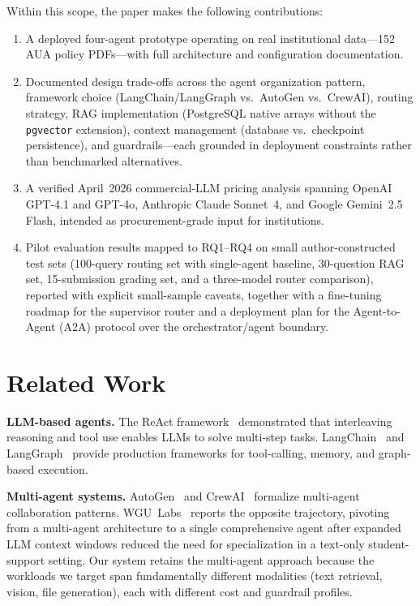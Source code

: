 \documentclass[conference]{IEEEtran}
\begin{document}
Within this scope, the paper makes the following contributions:
\begin{enumerate}
    \item A deployed four-agent prototype operating on real institutional data---152 AUA policy PDFs---with full architecture and configuration documentation.
    \item Documented design trade-offs across the agent organization pattern, framework choice (LangChain/LangGraph vs.\ AutoGen vs.\ CrewAI), routing strategy, RAG implementation (PostgreSQL native arrays without the \texttt{pgvector} extension), context management (database vs.\ checkpoint persistence), and guardrails---each grounded in deployment constraints rather than benchmarked alternatives.
    \item A verified April~2026 commercial-LLM pricing analysis spanning OpenAI GPT-4.1 and GPT-4o, Anthropic Claude Sonnet~4, and Google Gemini~2.5 Flash, intended as procurement-grade input for institutions.
    \item Pilot evaluation results mapped to RQ1--RQ4 on small author-constructed test sets (100-query routing set with single-agent baseline, 30-question RAG set, 15-submission grading set, and a three-model router comparison), reported with explicit small-sample caveats, together with a fine-tuning roadmap for the supervisor router and a deployment plan for the Agent-to-Agent (A2A) protocol over the orchestrator/agent boundary.
\end{enumerate}

\section{Related Work}

\textbf{LLM-based agents.} The ReAct framework~\cite{yao2023react} demonstrated that interleaving reasoning and tool use enables LLMs to solve multi-step tasks. LangChain~\cite{langchain2024} and LangGraph~\cite{langgraph2024} provide production frameworks for tool-calling, memory, and graph-based execution.

\textbf{Multi-agent systems.} AutoGen~\cite{wu2023autogen} and CrewAI~\cite{crewai2024} formalize multi-agent collaboration patterns. WGU~Labs~\cite{wgu_labs_2025} reports the opposite trajectory, pivoting from a multi-agent architecture to a single comprehensive agent after expanded LLM context windows reduced the need for specialization in a text-only student-support setting. Our system retains the multi-agent approach because the workloads we target span fundamentally different modalities (text retrieval, vision, file generation), each with different cost and guardrail profiles.
\end{document}
